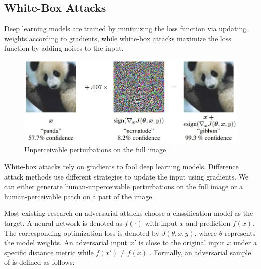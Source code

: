 
\subsection{White-Box Attacks}
\label{sec:whitebox_attack}

Deep learning models are trained by minimizing the loss function via updating weights according to gradients, while white-box attacks maximize the loss function by adding noises to the input.

\begin{figure}[H]
\centering
\includegraphics[scale=0.5]{figures/chapter_intro/fgsm.jpg}
\caption{Unperceivable perturbations on the full image}
\label{fig.adv_perturb}
\end{figure}

White-box attacks rely on gradients to fool deep learning models. Difference attack methods use different strategies to update the input using gradients. We can either generate human-unperceivable perturbations on the full image or a human-perceivable patch on a part of the image.

Most existing research on adversarial attacks choose a classification model as the target. A neural network is denoted as $f(\cdot)$ with input $x$ and prediction $f(x)$. The corresponding optimization loss is denoted by $J(\theta, x, y)$, where $\theta$ represents the model weights. An adversarial input $x'$ is close to the original input $x$ under a specific distance metric while $f(x') \neq f(x)$ \citep{REN2020346}. Formally, an adversarial sample of  is defined as follows:

